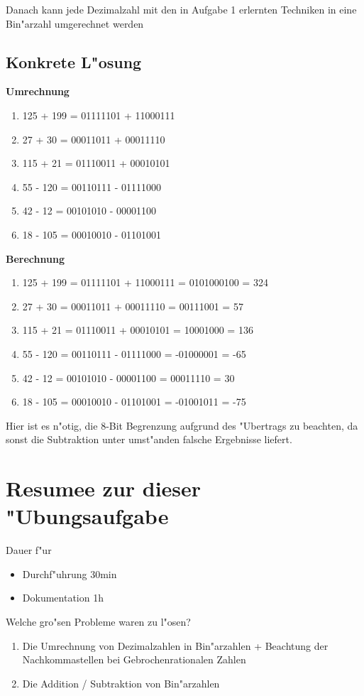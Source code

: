 \documentclass[a4paper,11pt,titlepage]{article}
\begin{document}
    Danach kann jede Dezimalzahl mit den in Aufgabe 1 erlernten Techniken in eine Bin"arzahl umgerechnet werden

    \subsection{Konkrete L"osung}

    \noindent \textbf{Umrechnung}
    \begin{enumerate}
        \item 125 + 199 = 01111101 + 11000111
        \item 27 + 30 = 00011011 + 00011110
        \item 115 + 21 = 01110011 + 00010101
        \item 55 - 120 = 00110111 - 01111000
        \item 42 - 12 = 00101010 - 00001100
        \item 18 - 105 = 00010010 - 01101001
    \end{enumerate}

    \noindent \textbf{Berechnung}
    \begin{enumerate}
        \item 125 + 199 = 01111101 + 11000111 = 0101000100 = 324
        \item 27 + 30 = 00011011 + 00011110 = 00111001 = 57
        \item 115 + 21 = 01110011 + 00010101 = 10001000 = 136
        \item 55 - 120 = 00110111 - 01111000 = -01000001 = -65
        \item 42 - 12 = 00101010 - 00001100 = 00011110 = 30
        \item 18 - 105 = 00010010 - 01101001 = -01001011 = -75
    \end{enumerate}

    Hier ist es n"otig, die 8-Bit Begrenzung aufgrund des "Ubertrags zu beachten, da sonst die Subtraktion unter umst"anden falsche Ergebnisse liefert.



    \section{Resumee zur dieser "Ubungsaufgabe}
    Dauer f"ur
    \begin{itemize}
        \item Durchf"uhrung 30min
        \item Dokumentation 1h
    \end{itemize}
    Welche gro"sen Probleme waren zu l"osen?
    \begin{enumerate}
        \item Die Umrechnung von Dezimalzahlen in Bin"arzahlen + Beachtung der Nachkommastellen bei Gebrochenrationalen Zahlen
        \item Die Addition / Subtraktion von Bin"arzahlen
    \end{enumerate}
\end{document}

